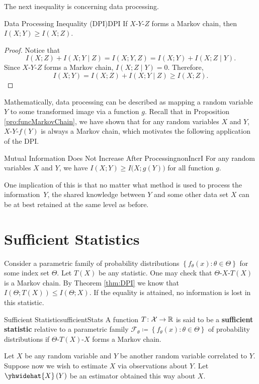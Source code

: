 \documentclass[math]{amznotes}
\theoremstyle{remark}
\begin{document}
The next inequality is concerning data processing.
\begin{thmbox}{Data Processing Inequality (DPI)}{DPI}
    If $X$-$Y$-$Z$ forms a Markov chain, then $I\left(X ; Y\right) \geq I\left(X ; Z\right)$.
    \tcblower
    \begin{proof}
        Notice that 
        \begin{equation*}
            I\left(X ; Z\right) + I\left(X ; Y \mid Z\right) = I\left(X ; Y, Z\right) = I\left(X ; Y\right) + I\left(X; Z \mid Y\right).
        \end{equation*}
        Since $X$-$Y$-$Z$ forms a Markov chain, $I\left(X ; Z \mid Y\right) = 0$. Therefore, 
        \begin{equation*}
            I\left(X ; Y\right) = I\left(X ; Z\right) + I\left(X ; Y \mid Z\right) \geq I\left(X ; Z\right).
        \end{equation*}
    \end{proof}
\end{thmbox}
Mathematically, data processing can be described as mapping a random variable $Y$ to some transformed image via a function $g$. Recall that in Proposition \ref{pro:funcMarkovChain}, we have shown that for any random variables $X$ and $Y$, $X$-$Y$-$f\left(Y\right)$ is always a Markov chain, which motivates the following application of the DPI.
\begin{corbox}{Mutual Information Does Not Increase After Processing}{nonIncrI}
    For any random variables $X$ and $Y$, we have $I\left(X ; Y\right) \geq I\bigl(X ; g\left(Y\right)\bigr)$ for all function $g$.
\end{corbox}
One implication of this is that no matter what method is used to process the information~$Y$, the shared knowledge between $Y$ and some other data set $X$ can be at best retained at the same level as before.
\section{Sufficient Statistics}
Consider a parametric family of probability distributions $\left\{f_{\theta}\left(x\right) \colon \theta \in \Theta\right\}$ for some index set $\Theta$. Let $T\left(X\right)$ be any statistic. One may check that $\Theta$-$X$-$T\left(X\right)$ is a Markov chain. By Theorem \ref{thm:DPI} we know that $I\left(\Theta ; T\left(X\right)\right) \leq I\left(\Theta ; X\right)$. If the equality is attained, no information is lost in this statistic.
\begin{dfnbox}{Sufficient Statistic}{sufficientStats}
    A function $T \colon \mathcal{X} \to \mathbb{R}$ is said to be a {\color{red} \textbf{sufficient statistic}} relative to a parametric family $\mathcal{F}_{\theta} \coloneqq \left\{f_{\theta}\left(x\right) \colon \theta \in \Theta\right\}$ of probability distributions if $\Theta$-$T\left(X\right)$-$X$ forms a Markov chain.
\end{dfnbox}
Let $X$ be any random variable and $Y$ be another random variable correlated to $Y$. Suppose now we wish to estimate $X$ via observations about $Y$. Let $\yhwidehat{X}\left(Y\right)$ be an estimator obtained this way about $X$.
\end{document}

